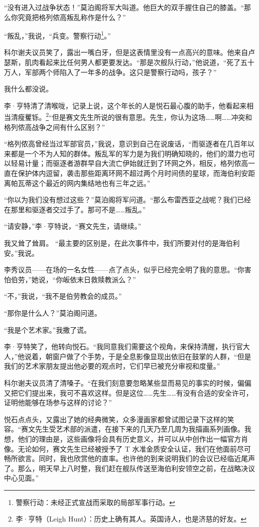 \documentclass[AutoFakeBold=true]{book}
\begin{document}
``没有进入过战争状态！''莫泊阁将军大叫道。他巨大的双手握住自己的膝盖。``那么你究竟把格列侬高叛乱称作是什么？''

``叛乱，''我说，``兵变。警察行动\footnote{警察行动：未经正式宣战而采取的局部军事行动。}。''

科尔谢夫议员笑了，露出一嘴白牙，但是这表情里没有一点高兴的意味。他来自卢瑟斯，肌肉看起来比任何男人都更要发达。``那是次舰队行动，''他说道，``死了五十万人，军部两个师陷入了一年多的战争。这只是警察行动吗，孩子？''

我什么都没说。

李·亨特清了清喉咙，记录上说，这个年长的人是悦石最心腹的助手，他看起来相当清瘦矍铄。\footnote{李·亨特（Leigh Hunt）：历史上确有其人。英国诗人，也是济慈的好友。}``但是赛文先生所说的很有意思。先生，你认为这场……啊……冲突和格列侬高战争之间有什么区别？''

``格列侬高曾经当过军部官员，''我说，意识到自己在说废话，``而驱逐者在几百年以来都是一个不为人知的群体。叛乱军的军力是为我们明确知晓的，他们的潜力也可以轻易计量；而驱逐者游群早自大流亡伊始就迁到了环网之外，相反，格列侬高一直在保护体内逗留，袭击那些距离环网不超过两个月时间债的星球，而海伯利安距离帕瓦蒂这个最近的网内集结地也有{\kaishu 三年}之远。''

``你以为我们没有想过这些？''莫泊阁将军问道。``那么布雷西亚之战呢？我们已经在那里和驱逐者交过手了。那可不是……叛乱。''

``请安静，''李·亨特说，``赛文先生，请继续。''

我又耸了耸肩。 ``最主要的区别是，在此次事件中，我们所要对付的是海伯利安。''我说。

李秀议员——在场的一名女性——点了点头，似乎已经完全明了我的意思。``你害怕伯劳，''她说，``你皈依末日救赎教派么？''

``不，''我说，``我不是伯劳教会的成员。''

``那你是什么人？''莫泊阁问道。

``我是个艺术家。''我撒了谎。

李·亨特笑了，他转向悦石。``我同意我们需要这个视角，来保持清醒，执行官大人，''他说着，朝窗户做了个手势，于是全息影像显现出依旧在鼓掌的人群，``但是我们的艺术家朋友提出他必要的观点时，它们早已被充分审视和度量。''

科尔谢夫议员清了清嗓子。``在我们刻意要忽略某些显而易见的事实的时候，偏偏又把它们提出来，我可不喜欢这样。但是这位……先生……有没有合适的安全许可，证明他能够在场参与这样的讨论？''

悦石点点头，又露出了她的经典微笑，众多漫画家都曾试图记录下这样的笑容。``赛文先生受艺术部的派遣，在接下来的几天乃至几周为我描画系列画像。我想，他们的理由是，这些画像将会具有历史意义，并可以从中创作出一幅官方肖像。无论如何，赛文先生已经被授予了 T 水准金质安全认证，我们在他面前尽可畅所欲言。同时，我也欣赏他的直率。也许他的到来说明我们的会议已经临近尾声了。那么，明天早上八时整，我们赶在舰队传送至海伯利安领空之前，在战略决议中心见面。''
\end{document}

